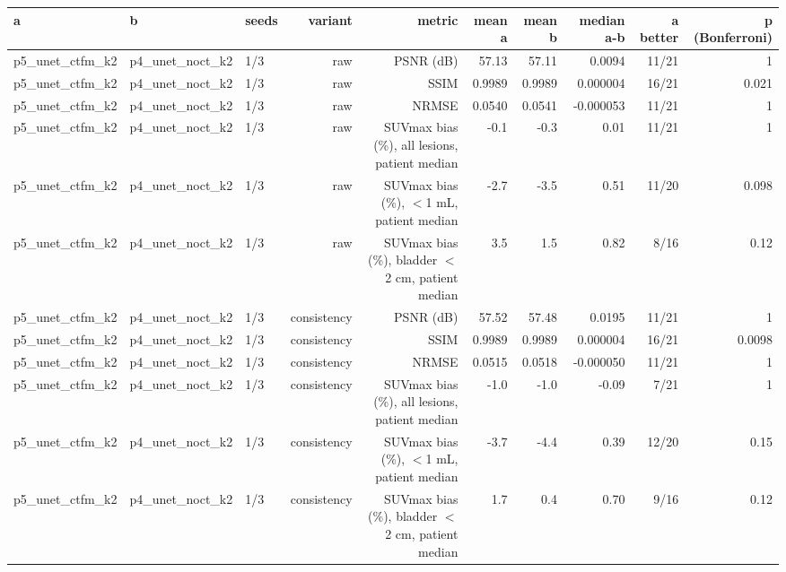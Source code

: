 \begin{tabular}{lllrrrrrrr}
\toprule
a & b & seeds & variant & metric & mean a & mean b & median a-b & a better & p (Bonferroni) \\
\midrule
p5\_unet\_ctfm\_k2 & p4\_unet\_noct\_k2 & 1/3 & raw & PSNR (dB) & 57.13 & 57.11 & 0.0094 & 11/21 & 1 \\
p5\_unet\_ctfm\_k2 & p4\_unet\_noct\_k2 & 1/3 & raw & SSIM & 0.9989 & 0.9989 & 0.000004 & 16/21 & 0.021 \\
p5\_unet\_ctfm\_k2 & p4\_unet\_noct\_k2 & 1/3 & raw & NRMSE & 0.0540 & 0.0541 & -0.000053 & 11/21 & 1 \\
p5\_unet\_ctfm\_k2 & p4\_unet\_noct\_k2 & 1/3 & raw & SUVmax bias (\%), all lesions, patient median & -0.1 & -0.3 & 0.01 & 11/21 & 1 \\
p5\_unet\_ctfm\_k2 & p4\_unet\_noct\_k2 & 1/3 & raw & SUVmax bias (\%), $<$1 mL, patient median & -2.7 & -3.5 & 0.51 & 11/20 & 0.098 \\
p5\_unet\_ctfm\_k2 & p4\_unet\_noct\_k2 & 1/3 & raw & SUVmax bias (\%), bladder $<$2 cm, patient median & 3.5 & 1.5 & 0.82 & 8/16 & 0.12 \\
p5\_unet\_ctfm\_k2 & p4\_unet\_noct\_k2 & 1/3 & consistency & PSNR (dB) & 57.52 & 57.48 & 0.0195 & 11/21 & 1 \\
p5\_unet\_ctfm\_k2 & p4\_unet\_noct\_k2 & 1/3 & consistency & SSIM & 0.9989 & 0.9989 & 0.000004 & 16/21 & 0.0098 \\
p5\_unet\_ctfm\_k2 & p4\_unet\_noct\_k2 & 1/3 & consistency & NRMSE & 0.0515 & 0.0518 & -0.000050 & 11/21 & 1 \\
p5\_unet\_ctfm\_k2 & p4\_unet\_noct\_k2 & 1/3 & consistency & SUVmax bias (\%), all lesions, patient median & -1.0 & -1.0 & -0.09 & 7/21 & 1 \\
p5\_unet\_ctfm\_k2 & p4\_unet\_noct\_k2 & 1/3 & consistency & SUVmax bias (\%), $<$1 mL, patient median & -3.7 & -4.4 & 0.39 & 12/20 & 0.15 \\
p5\_unet\_ctfm\_k2 & p4\_unet\_noct\_k2 & 1/3 & consistency & SUVmax bias (\%), bladder $<$2 cm, patient median & 1.7 & 0.4 & 0.70 & 9/16 & 0.12 \\
\bottomrule
\end{tabular}
